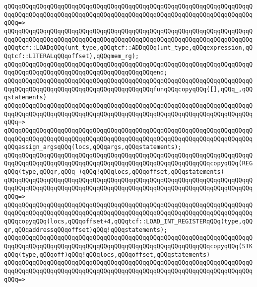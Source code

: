 \verb|qQQqqQQqqQQqqQQqqQQqqQQqqQQqqQQqqQQqqQQqqQQqqQQqqQQqqQQqqQQqqQQqqQQqqQQqqQQqqQQqqQQqqQQqqQQqqQQqqQQqqQQqqQQqqQQqqQQqqQQqqQQqqQQqqQQqqQQqqQQqqQQq=>|\newline
\verb|qQQqqQQqqQQqqQQqqQQqqQQqqQQqqQQqqQQqqQQqqQQqqQQqqQQqqQQqqQQqqQQqqQQqqQQqqQQqqQQqqQQqqQQqqQQqqQQqqQQqqQQqqQQqqQQqqQQqqQQqqQQqqQQqqQQqqQQqqQQqqQQqtcf::LOADqQQq(unt_type,qQQqtcf::ADDqQQq(unt_type,qQQqexpression,qQQqtcf::LITERALqQQqoffset),qQQqmem_rg);|\newline
\verb|qQQqqQQqqQQqqQQqqQQqqQQqqQQqqQQqqQQqqQQqqQQqqQQqqQQqqQQqqQQqqQQqqQQqqQQqqQQqqQQqqQQqqQQqqQQqqQQqqQQqqQQqqQQqqQQqend;|\newline
\newline
\verb|qQQqqQQqqQQqqQQqqQQqqQQqqQQqqQQqqQQqqQQqqQQqqQQqqQQqqQQqqQQqqQQqqQQqqQQqqQQqqQQqqQQqqQQqqQQqqQQqqQQqqQQqqQQqqQQqfunqQQqcopyqQQq([],qQQq_,qQQqstatements)|\newline
\verb|qQQqqQQqqQQqqQQqqQQqqQQqqQQqqQQqqQQqqQQqqQQqqQQqqQQqqQQqqQQqqQQqqQQqqQQqqQQqqQQqqQQqqQQqqQQqqQQqqQQqqQQqqQQqqQQqqQQqqQQqqQQqqQQqqQQqqQQqqQQqqQQq=>|\newline
\verb|qQQqqQQqqQQqqQQqqQQqqQQqqQQqqQQqqQQqqQQqqQQqqQQqqQQqqQQqqQQqqQQqqQQqqQQqqQQqqQQqqQQqqQQqqQQqqQQqqQQqqQQqqQQqqQQqqQQqqQQqqQQqqQQqqQQqqQQqqQQqqQQqassign_argsqQQq(locs,qQQqargs,qQQqstatements);|\newline
\newline
\verb|qQQqqQQqqQQqqQQqqQQqqQQqqQQqqQQqqQQqqQQqqQQqqQQqqQQqqQQqqQQqqQQqqQQqqQQqqQQqqQQqqQQqqQQqqQQqqQQqqQQqqQQqqQQqqQQqqQQqqQQqqQQqqQQqcopyqQQq(REGqQQq(type,qQQqr,qQQq_)qQQq!qQQqlocs,qQQqoffset,qQQqstatements)|\newline
\verb|qQQqqQQqqQQqqQQqqQQqqQQqqQQqqQQqqQQqqQQqqQQqqQQqqQQqqQQqqQQqqQQqqQQqqQQqqQQqqQQqqQQqqQQqqQQqqQQqqQQqqQQqqQQqqQQqqQQqqQQqqQQqqQQqqQQqqQQqqQQqqQQq=>|\newline
\verb|qQQqqQQqqQQqqQQqqQQqqQQqqQQqqQQqqQQqqQQqqQQqqQQqqQQqqQQqqQQqqQQqqQQqqQQqqQQqqQQqqQQqqQQqqQQqqQQqqQQqqQQqqQQqqQQqqQQqqQQqqQQqqQQqqQQqqQQqqQQqqQQqcopyqQQq(locs,qQQqoffset+4,qQQqtcf::LOAD_INT_REGISTERqQQq(type,qQQqr,qQQqaddressqQQqoffset)qQQq!qQQqstatements);|\newline
\newline
\verb|qQQqqQQqqQQqqQQqqQQqqQQqqQQqqQQqqQQqqQQqqQQqqQQqqQQqqQQqqQQqqQQqqQQqqQQqqQQqqQQqqQQqqQQqqQQqqQQqqQQqqQQqqQQqqQQqqQQqqQQqqQQqqQQqcopyqQQq(STKqQQq(type,qQQqoff)qQQq!qQQqlocs,qQQqoffset,qQQqstatements)|\newline
\verb|qQQqqQQqqQQqqQQqqQQqqQQqqQQqqQQqqQQqqQQqqQQqqQQqqQQqqQQqqQQqqQQqqQQqqQQqqQQqqQQqqQQqqQQqqQQqqQQqqQQqqQQqqQQqqQQqqQQqqQQqqQQqqQQqqQQqqQQqqQQqqQQq=>|\newline
